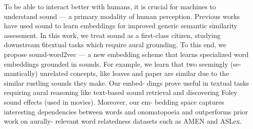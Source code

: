 To be able to interact better with humans, it is crucial for machines to understand sound --- a primary modality of human perception. Previous works have used sound to learn embeddings for improved generic semantic similarity assessment. In this work, we treat sound as a first-class citizen, studying downstream 6textual tasks which require aural grounding. To this end, we propose sound-word2vec --- a new embedding scheme that learns specialized word embeddings grounded in sounds. For example, we learn that two seemingly (se- mantically) unrelated concepts, like leaves and paper are similar due to the similar rustling sounds they make. Our embed- dings prove useful in textual tasks requiring aural reasoning like text-based sound retrieval and discovering Foley sound effects (used in movies). Moreover, our em- bedding space captures interesting dependencies between words and onomatopoeia and outperforms prior work on aurally- relevant word relatedness datasets such as AMEN and ASLex.
